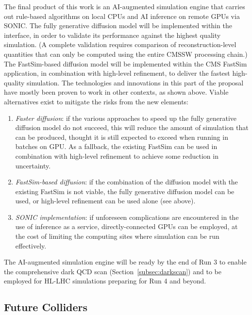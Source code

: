 The final product of this work is an AI-augmented simulation engine
that carries out rule-based algorithms on local CPUs and AI inference on remote GPUs via SONIC.
The fully generative diffusion model will be implemented within the \GEANTfour interface, in order to validate its performance against the highest quality simulation.
(A complete validation requires comparison of reconstruction-level quantities that can only be computed using the entire CMSSW processing chain.)
The FastSim-based diffusion model will be implemented within the CMS FastSim application, in combination with high-level refinement, to deliver the fastest high-quality simulation.
The technologies and innovations in this part of the proposal have mostly been proven to work in other contexts, as shown above.
Viable alternatives exist to mitigate the risks from the new elements:
\begin{enumerate}
\item \textit{Faster diffusion}: if the various approaches to speed up the fully generative diffusion model do not succeed, this will reduce the amount of simulation that can be produced, thought it is still expected to exceed \GEANTfour when running in batches on GPU. As a fallback, the existing FastSim can be used in combination with high-level refinement to achieve some reduction in uncertainty.
\item \textit{FastSim-based diffusion}: if the combination of the diffusion model with the existing FastSim is not viable, the fully generative diffusion model can be used, or high-level refinement can be used alone (see above).
\item \textit{SONIC implementation}: if unforeseen complications are encountered in the use of inference as a service, directly-connected GPUs can be employed, at the cost of limiting the computing sites where simulation can be run effectively.
\end{enumerate}
The AI-augmented simulation engine will be ready by the end of Run 3 to enable the comprehensive dark QCD scan (Section~\ref{subsec:darkscan})
and to be employed for HL-LHC simulations preparing for Run 4 and beyond.

\subsection{Future Colliders}\label{subsec:mucoll}
